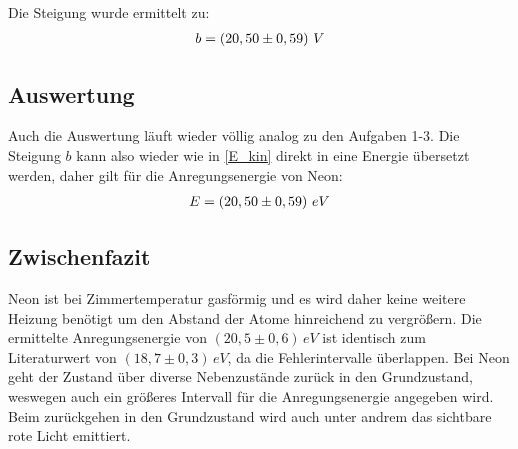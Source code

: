 \begin{center}
\begin{minipage}{\linewidth}
\centering
{}
\label{graph_a3}
\end{minipage}
\end{center}
Die Steigung wurde ermittelt zu:
\begin{align}
b = \left( 20,50 \pm 0,59 \right)\, V \notag
\end{align}
\subsection{Auswertung}
Auch die Auswertung läuft wieder völlig analog zu den Aufgaben 1-3.
Die Steigung \(b\) kann also wieder wie in \eqref{E_kin} direkt in eine Energie übersetzt werden, daher gilt für die Anregungsenergie von Neon:
\begin{align}
E = \left( 20,50 \pm 0,59 \right)\, eV \notag
\end{align}
\subsection{Zwischenfazit}
Neon ist bei Zimmertemperatur gasförmig und es wird daher keine weitere Heizung benötigt um den Abstand der Atome hinreichend zu vergrößern. Die ermittelte Anregungsenergie von \(\left( 20,5 \pm 0,6\right)\, eV \) ist identisch zum Literaturwert von \(\left( 18,7 \pm 0,3\right)\, eV \), da die Fehlerintervalle überlappen. Bei Neon geht der Zustand über diverse Nebenzustände zurück in den Grundzustand, weswegen auch ein größeres Intervall für die Anregungsenergie angegeben wird. Beim zurückgehen in den Grundzustand wird auch unter andrem das sichtbare rote Licht emittiert.